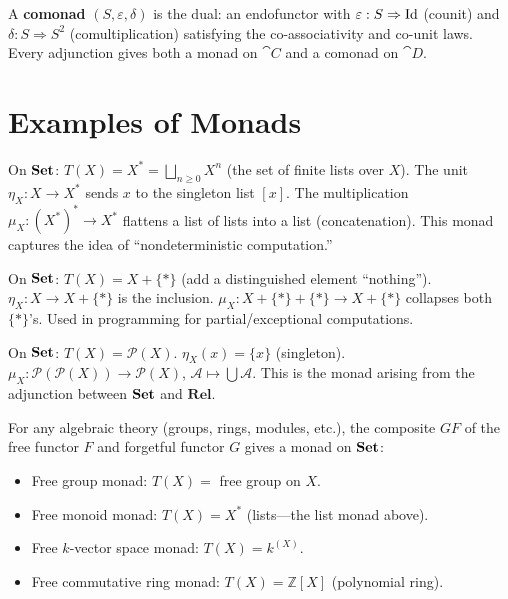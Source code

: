 \begin{remark}[Comonad]
A \textbf{comonad} $(S, \varepsilon, \delta)$ is the dual: an endofunctor with $\varepsilon: S \Rightarrow \mathrm{Id}$ (counit) and $\delta: S \Rightarrow S^2$ (comultiplication) satisfying the co-associativity and co-unit laws. Every adjunction gives both a monad on $\cat{C}$ and a comonad on $\cat{D}$.
\end{remark}

\section{Examples of Monads}

\begin{example}
On $\mathbf{Set}$: $T(X) = X^* = \bigsqcup_{n \geq 0} X^n$ (the set of finite lists over $X$). The unit $\eta_X: X \to X^*$ sends $x$ to the singleton list $[x]$. The multiplication $\mu_X: (X^*)^* \to X^*$ flattens a list of lists into a list (concatenation). This monad captures the idea of ``nondeterministic computation.''
\end{example}

\begin{example}
On $\mathbf{Set}$: $T(X) = X + \{*\}$ (add a distinguished element ``nothing''). $\eta_X: X \to X + \{*\}$ is the inclusion. $\mu_X: X + \{*\} + \{*\} \to X + \{*\}$ collapses both $\{*\}$'s. Used in programming for partial/exceptional computations.
\end{example}

\begin{example}
On $\mathbf{Set}$: $T(X) = \mathcal{P}(X)$. $\eta_X(x) = \{x\}$ (singleton). $\mu_X: \mathcal{P}(\mathcal{P}(X)) \to \mathcal{P}(X)$, $\mathcal{A} \mapsto \bigcup \mathcal{A}$. This is the monad arising from the adjunction between $\mathbf{Set}$ and $\mathbf{Rel}$.
\end{example}

\begin{example}
For any algebraic theory (groups, rings, modules, etc.), the composite $GF$ of the free functor $F$ and forgetful functor $G$ gives a monad on $\mathbf{Set}$:
\begin{itemize}
  \item Free group monad: $T(X) = $ free group on $X$.
  \item Free monoid monad: $T(X) = X^*$ (lists—the list monad above).
  \item Free $k$-vector space monad: $T(X) = k^{(X)}$.
  \item Free commutative ring monad: $T(X) = \mathbb{Z}[X]$ (polynomial ring).
\end{itemize}
\end{example}

